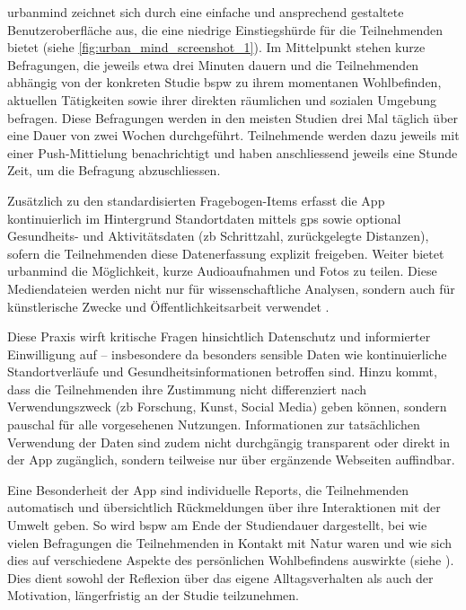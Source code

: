\gls{urbanmind} zeichnet sich durch eine einfache und ansprechend gestaltete Benutzeroberfläche aus, die eine niedrige Einstiegshürde für die Teilnehmenden bietet (siehe \cref{fig:urban_mind_screenshot_1}). Im Mittelpunkt stehen kurze Befragungen, die jeweils etwa drei Minuten dauern und die Teilnehmenden abhängig von der konkreten Studie \gls{bspw} zu ihrem momentanen Wohlbefinden, aktuellen Tätigkeiten sowie ihrer direkten räumlichen und sozialen Umgebung befragen. Diese Befragungen werden in den meisten Studien drei Mal täglich über eine Dauer von zwei Wochen durchgeführt. Teilnehmende werden dazu jeweils mit einer Push-Mittielung benachrichtigt und haben anschliessend jeweils eine Stunde Zeit, um die Befragung abzuschliessen.

Zusätzlich zu den standardisierten Fragebogen-Items erfasst die App kontinuierlich im Hintergrund Standortdaten mittels \gls{gps} sowie optional Gesundheits- und Aktivitätsdaten (\gls{zb} Schrittzahl, zurückgelegte Distanzen), sofern die Teilnehmenden diese Datenerfassung explizit freigeben. Weiter bietet \gls{urbanmind} die Möglichkeit, kurze Audioaufnahmen und Fotos zu teilen. Diese Mediendateien werden nicht nur für wissenschaftliche Analysen, sondern auch für künstlerische Zwecke und Öffentlichkeitsarbeit verwendet \parencite{UrbanMindPrivacy}.

Diese Praxis wirft kritische Fragen hinsichtlich Datenschutz und informierter Einwilligung auf -- insbesondere da besonders sensible Daten wie kontinuierliche Standortverläufe und Gesundheitsinformationen betroffen sind. Hinzu kommt, dass die Teilnehmenden ihre Zustimmung nicht differenziert nach Verwendungszweck (\gls{zb} Forschung, Kunst, Social Media) geben können, sondern pauschal für alle vorgesehenen Nutzungen. Informationen zur tatsächlichen Verwendung der Daten sind zudem nicht durchgängig transparent oder direkt in der App zugänglich, sondern teilweise nur über ergänzende Webseiten auffindbar.

Eine Besonderheit der App sind individuelle Reports, die Teilnehmenden automatisch und übersichtlich Rückmeldungen über ihre Interaktionen mit der Umwelt geben. So wird \gls{bspw} am Ende der Studiendauer dargestellt, bei wie vielen Befragungen die Teilnehmenden in Kontakt mit Natur waren und wie sich dies auf verschiedene Aspekte des persönlichen Wohlbefindens auswirkte (siehe ). Dies dient sowohl der Reflexion über das eigene Alltagsverhalten als auch der Motivation, längerfristig an der Studie teilzunehmen.

